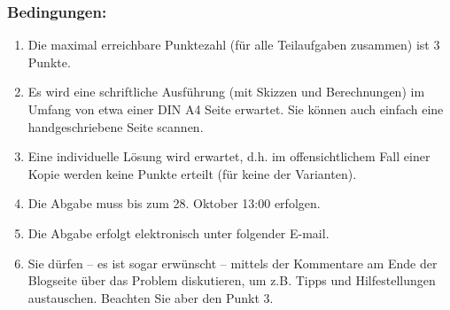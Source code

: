 \subsubsection{Bedingungen:}
\begin{enumerate}
  \item Die maximal erreichbare Punktezahl (für alle Teilaufgaben zusammen) 
        ist 3 Punkte.
  \item Es wird eine schriftliche Ausführung (mit Skizzen und Berechnungen) im 
        Umfang von etwa einer DIN A4 Seite erwartet. Sie können auch einfach 
        eine handgeschriebene Seite scannen.
  \item Eine individuelle Lösung wird erwartet, d.h. im offensichtlichem Fall 
        einer Kopie werden keine Punkte erteilt (für keine der Varianten).
  \item Die Abgabe muss bis zum 28. Oktober 13:00 erfolgen.
  \item Die Abgabe erfolgt elektronisch unter folgender E-mail.
  \item Sie dürfen – es ist sogar erwünscht – mittels der Kommentare am Ende 
        der Blogseite über das Problem diskutieren, um z.B. Tipps und 
        Hilfestellungen austauschen. Beachten Sie aber den Punkt 3.
\end{enumerate}